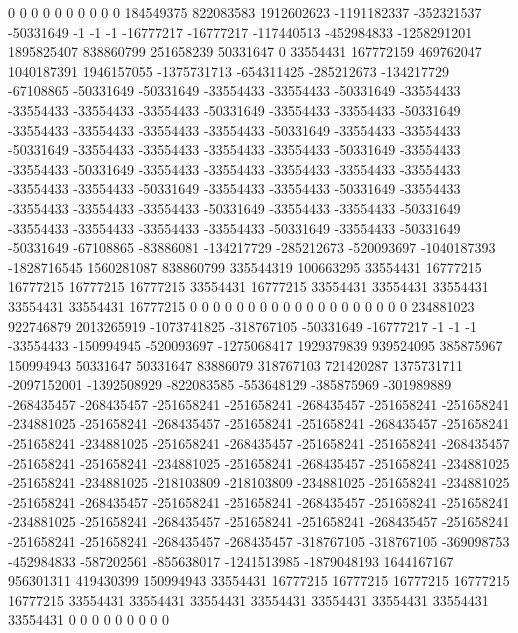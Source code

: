 0 0 0 0 0 0 0 0 0 0 184549375 822083583 1912602623 -1191182337 -352321537 -50331649 -1 -1 -1 -16777217 -16777217 -117440513 -452984833 -1258291201 1895825407 838860799 251658239 50331647 0 33554431 167772159 469762047 1040187391 1946157055 -1375731713 -654311425 -285212673 -134217729 -67108865 -50331649 -50331649 -33554433 -33554433 -50331649 -33554433 -33554433 -33554433 -33554433 -50331649 -33554433 -33554433 -50331649 -33554433 -33554433 -33554433 -33554433 -50331649 -33554433 -33554433 -50331649 -33554433 -33554433 -33554433 -33554433 -50331649 -33554433 -33554433 -50331649 -33554433 -33554433 -33554433 -33554433 -33554433 -33554433 -33554433 -50331649 -33554433 -33554433 -50331649 -33554433 -33554433 -33554433 -33554433 -50331649 -33554433 -33554433 -50331649 -33554433 -33554433 -33554433 -33554433 -50331649 -33554433 -50331649 -50331649 -67108865 -83886081 -134217729 -285212673 -520093697 -1040187393 -1828716545 1560281087 838860799 335544319 100663295 33554431 16777215 16777215 16777215 16777215 33554431 16777215 33554431 33554431 33554431 33554431 33554431 16777215 0 0 0 0 0 0 0 0 0
0 0 0 0 0 0 0 0 0 0 234881023 922746879 2013265919 -1073741825 -318767105 -50331649 -16777217 -1 -1 -1 -33554433 -150994945 -520093697 -1275068417 1929379839 939524095 385875967 150994943 50331647 50331647 83886079 318767103 721420287 1375731711 -2097152001 -1392508929 -822083585 -553648129 -385875969 -301989889 -268435457 -268435457 -251658241 -251658241 -268435457 -251658241 -251658241 -234881025 -251658241 -268435457 -251658241 -251658241 -268435457 -251658241 -251658241 -234881025 -251658241 -268435457 -251658241 -251658241 -268435457 -251658241 -251658241 -234881025 -251658241 -268435457 -251658241 -234881025 -251658241 -234881025 -218103809 -218103809 -234881025 -251658241 -234881025 -251658241 -268435457 -251658241 -251658241 -268435457 -251658241 -251658241 -234881025 -251658241 -268435457 -251658241 -251658241 -268435457 -251658241 -251658241 -251658241 -268435457 -268435457 -318767105 -318767105 -369098753 -452984833 -587202561 -855638017 -1241513985 -1879048193 1644167167 956301311 419430399 150994943 33554431 16777215 16777215 16777215 16777215 16777215 33554431 33554431 33554431 33554431 33554431 33554431 33554431 33554431 0 0 0 0 0 0 0 0 0
